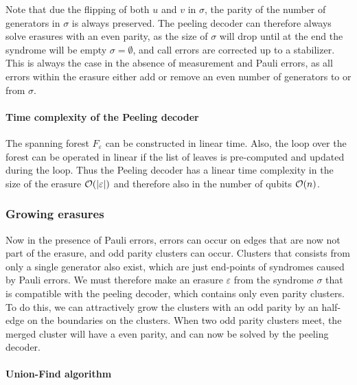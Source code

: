 \noindent Note that due the flipping of both $u$ and $v$ in $\sigma$, the parity of the number of generators in $\sigma$ is always preserved. The peeling decoder can therefore always solve erasures with an even parity, as the size of $\sigma$ will drop until at the end the syndrome will be empty $\sigma = \emptyset$, and call errors are corrected up to a stabilizer. This is always the case in the absence of measurement and Pauli errors, as all errors within the erasure either add or remove an even number of generators to or from $\sigma$.

\paragraph{Time complexity of the Peeling decoder}
The spanning forest $F_\varepsilon$ can be constructed in linear time. Also, the loop over the forest can be operated in linear if the list of leaves is pre-computed and updated during the loop. Thus the Peeling decoder has a linear time complexity in the size of the erasure $\mathcal{O}(\abs{\varepsilon})$ and therefore also in the number of qubits $\mathcal{O}(n)$.

\subsubsection{Growing erasures}

Now in the presence of Pauli errors, errors can occur on edges that are now not part of the erasure, and odd parity clusters can occur. Clusters that consists from only a single generator also exist, which are just end-points of syndromes caused by Pauli errors. We must therefore make an erasure $\varepsilon$ from the syndrome $\sigma$ that is compatible with the peeling decoder, which contains only even parity clusters. To do this, we can attractively grow the clusters with an odd parity by an half-edge on the boundaries on the clusters. When two odd parity clusters meet, the merged cluster will have a even parity, and can now be solved by the peeling decoder.

\paragraph{Union-Find algorithm}


